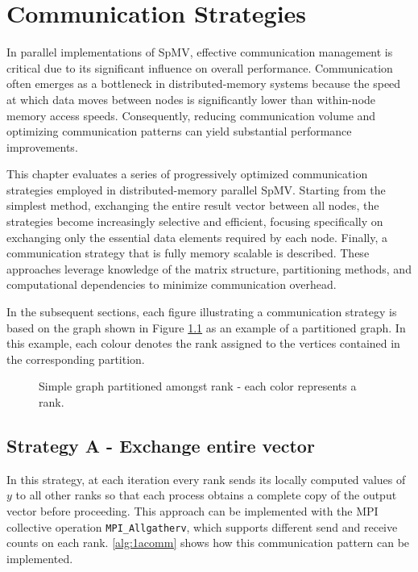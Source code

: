 \chapter{Communication Strategies}
\label{sec:commstrats}

In parallel implementations of SpMV, effective communication management is critical due to its significant influence on overall performance. Communication often emerges as a bottleneck in distributed-memory systems because the speed at which data moves between nodes is significantly lower than within-node memory access speeds. Consequently, reducing communication volume and optimizing communication patterns can yield substantial performance improvements.
\medskip

This chapter evaluates a series of progressively optimized communication strategies employed in distributed-memory parallel SpMV. Starting from the simplest method, exchanging the entire result vector between all nodes, the strategies become increasingly selective and efficient, focusing specifically on exchanging only the essential data elements required by each node. Finally, a communication strategy that is fully memory scalable is described. These approaches leverage knowledge of the matrix structure, partitioning methods, and computational dependencies to minimize communication overhead.
\medskip

In the subsequent sections, each figure illustrating a communication strategy is based on the graph shown in Figure \ref{fig:examplegraph} as an example of a partitioned graph. In this example, each colour denotes the rank assigned to the vertices contained in the corresponding partition.

\begin{figure}[H]
    \centering
    \caption{Simple graph partitioned amongst rank - each color represents a rank.}
    \label{fig:examplegraph}
\end{figure}

\section{Strategy A - Exchange entire vector}
In this strategy, at each iteration every rank sends its locally computed values of \(y\) to all other ranks so that each process obtains a complete copy of the output vector before proceeding. This approach can be implemented with the MPI collective operation \texttt{MPI\_Allgatherv}, which supports different send and receive counts on each rank. \autoref{alg:1acomm} shows how this communication pattern can be implemented.
\medskip

